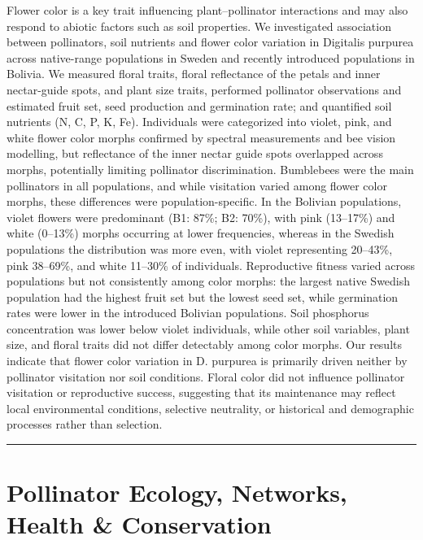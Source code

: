 \documentclass[
  letterpaper,
  DIV=11,
  numbers=noendperiod]{scrartcl}
\begin{document}
Flower color is a key trait influencing plant--pollinator interactions
and may also respond to abiotic factors such as soil properties. We
investigated association between pollinators, soil nutrients and flower
color variation in Digitalis purpurea across native-range populations in
Sweden and recently introduced populations in Bolivia. We measured
floral traits, floral reflectance of the petals and inner nectar-guide
spots, and plant size traits, performed pollinator observations and
estimated fruit set, seed production and germination rate; and
quantified soil nutrients (N, C, P, K, Fe). Individuals were categorized
into violet, pink, and white flower color morphs confirmed by spectral
measurements and bee vision modelling, but reflectance of the inner
nectar guide spots overlapped across morphs, potentially limiting
pollinator discrimination. Bumblebees were the main pollinators in all
populations, and while visitation varied among flower color morphs,
these differences were population-specific. In the Bolivian populations,
violet flowers were predominant (B1: 87\%; B2: 70\%), with pink
(13--17\%) and white (0--13\%) morphs occurring at lower frequencies,
whereas in the Swedish populations the distribution was more even, with
violet representing 20--43\%, pink 38--69\%, and white 11--30\% of
individuals. Reproductive fitness varied across populations but not
consistently among color morphs: the largest native Swedish population
had the highest fruit set but the lowest seed set, while germination
rates were lower in the introduced Bolivian populations. Soil phosphorus
concentration was lower below violet individuals, while other soil
variables, plant size, and floral traits did not differ detectably among
color morphs. Our results indicate that flower color variation in D.
purpurea is primarily driven neither by pollinator visitation nor soil
conditions. Floral color did not influence pollinator visitation or
reproductive success, suggesting that its maintenance may reflect local
environmental conditions, selective neutrality, or historical and
demographic processes rather than selection.

\begin{center}\rule{0.5\linewidth}{0.5pt}\end{center}

\section{Pollinator Ecology, Networks, Health \&
Conservation}\label{pollinator-ecology-networks-health-conservation}
\end{document}
